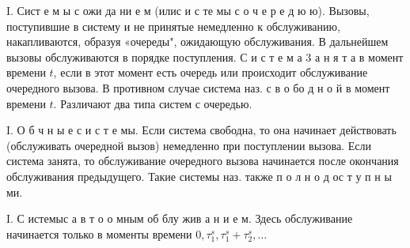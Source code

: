 \documentclass[10pt]{article}
\begin{document}
I. Сист е м ы с ожи да ни е м (илис и с те мы с о ч е р е д ю ю). Вызовы, поступившие в систему и не принятые немедленно к обслуживанию, накапливаются, образуя «очереды", ожидающую обслуживания. В дальнейшем вызовы обслуживаются в порядке поступления. С и с т е м а 3 а н я т а в момент времени $t$, если в этот момент есть очередь или происходит обслуживание очередного вызова. В противном случае система наз. с в о бо д н о й в момент времени $t$. Различают два типа систем с очередью.



I. О б ч н ы е с и с т е мы. Если система свободна, то она начинает действовать (обслуживать очередной вызов) немедленно при поступлении вызова. Если система занята, то обслуживание очередного вызова начинается после окончания обслуживания предыдущего. Такие системы наз. также п о л н о д ос т у п н ы ми.



I. С истемыс а в т о о мным об блу жив а н и е м. Здесь обслуживание начинается только в моменты времени $0, \tau_{1}^{s}, \tau_{1}^{s}+\tau_{2}^{s}, \ldots$
\end{document}
